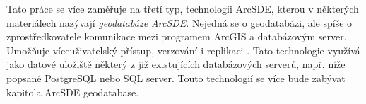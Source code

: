         Tato práce se více zaměřuje na třetí typ, technologii ArcSDE, kterou v některých materiálech nazývají {\it geodatabáze ArcSDE}. Nejedná se o geodatabázi, ale spíše o zprostředkovatele komunikace mezi programem ArcGIS a databázovým server. Umožňuje víceuživatelský přístup, verzování i replikaci \citep{Esri2006}. Tato technologie využívá jako datové uložiště některý z již existujících databázových serverů, např. níže popsané PostgreSQL nebo SQL server. Touto technologií se více bude zabývat kapitola  ArcSDE geodatabase.

